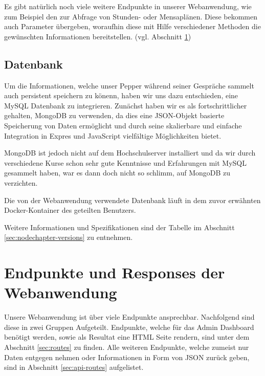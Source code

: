 Es gibt natürlich noch viele weitere Endpunkte in unserer Webanwendung, wie zum Beispiel den zur Abfrage von Stunden- oder Mensaplänen.
Diese bekommen auch Parameter übergeben, woraufhin diese mit Hilfe verschiedener Methoden die gewünschten Informationen bereitstellen.
(vgl. Abschnitt \ref{sec:nodechapter-implementation-routes})

\subsection{Datenbank}
\label{sec:nodechapter-database}
Um die Informationen, welche unser Pepper während seiner Gespräche sammelt auch persistent speichern zu könenn,
haben wir uns dazu entschieden, eine MySQL Datenbank zu integrieren. Zunächst haben wir es als fortschrittlicher
gehalten, MongoDB zu verwenden, da dies eine JSON-Objekt basierte Speicherung von Daten ermöglicht und durch seine
skalierbare und einfache Integration in Expres und JavaScript vielfältige Möglichkeiten bietet.

MongoDB ist jedoch nicht auf dem Hochschulserver installiert und da wir durch verschiedene Kurse schon sehr gute Kenntnisse
und Erfahrungen mit MySQL gesammelt haben, war es dann doch nicht so schlimm, auf MongoDB zu verzichten.

Die von der Webanwendung verwendete Datenbank läuft in dem zuvor erwähnten Docker-Kontainer des geteilten Benutzers.

Weitere Informationen und Spezifikationen sind der Tabelle im Abschnitt \ref{sec:nodechapter-versions} zu entnehmen.


\newpage
\section{Endpunkte und Responses der Webanwendung}
\label{sec:nodechapter-implementation-routes}
Unsere Webanwendung ist über viele Endpunkte ansprechbar.
Nachfolgend sind diese in zwei Gruppen Aufgeteilt.
Endpunkte, welche für das Admin Dashboard benötigt werden, sowie als Resultat eine HTML Seite rendern,
sind unter dem Abschnitt \ref{sec:routes} zu finden.
Alle weiteren Endpunkte, welche zumeist nur Daten entgegen nehmen oder Informationen in Form
von JSON zurück geben, sind in Abschnitt \ref{sec:api-routes} aufgelistet.

